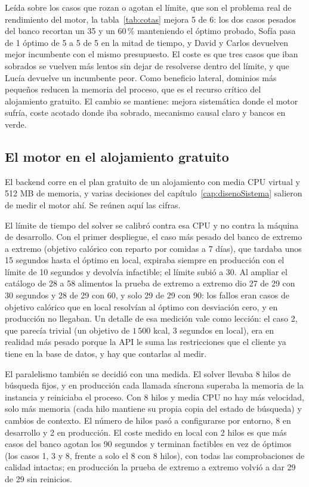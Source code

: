 Leída sobre los casos que rozan o agotan el límite, que son el problema real de rendimiento del motor, la tabla~\ref{tab:cotas} mejora 5 de 6: los dos casos pesados del banco recortan un 35 y un 60\,\% manteniendo el óptimo probado, Sofía pasa de 1 óptimo de 5 a 5 de 5 en la mitad de tiempo, y David y Carlos devuelven mejor incumbente con el mismo presupuesto. El coste es que tres casos que iban sobrados se vuelven más lentos sin dejar de resolverse dentro del límite, y que Lucía devuelve un incumbente peor. Como beneficio lateral, dominios más pequeños reducen la memoria del proceso, que es el recurso crítico del alojamiento gratuito. El cambio se mantiene: mejora sistemática donde el motor sufría, coste acotado donde iba sobrado, mecanismo causal claro y bancos en verde.

\subsection{El motor en el alojamiento gratuito}
\label{sec:evalHosting}

El backend corre en el plan gratuito de un alojamiento con media CPU virtual y 512 MB de memoria, y varias decisiones del capítulo~\ref{cap:disenoSistema} salieron de medir el motor ahí. Se reúnen aquí las cifras.

El límite de tiempo del solver se calibró contra esa CPU y no contra la máquina de desarrollo. Con el primer despliegue, el caso más pesado del banco de extremo a extremo (objetivo calórico con reparto por comidas a 7 días), que tardaba unos 15 segundos hasta el óptimo en local, expiraba siempre en producción con el límite de 10 segundos y devolvía infactible; el límite subió a 30. Al ampliar el catálogo de 28 a 58 alimentos la prueba de extremo a extremo dio 27 de 29 con 30 segundos y 28 de 29 con 60, y solo 29 de 29 con 90: los fallos eran casos de objetivo calórico que en local resolvían al óptimo con desviación cero, y en producción no llegaban. Un detalle de esa medición vale como lección: el caso 2, que parecía trivial (un objetivo de $1\,500$ kcal, 3 segundos en local), era en realidad más pesado porque la API le suma las restricciones que el cliente ya tiene en la base de datos, y hay que contarlas al medir.

El paralelismo también se decidió con una medida. El solver llevaba 8 hilos de búsqueda fijos, y en producción cada llamada síncrona superaba la memoria de la instancia y reiniciaba el proceso. Con 8 hilos y media CPU no hay más velocidad, solo más memoria (cada hilo mantiene su propia copia del estado de búsqueda) y cambios de contexto. El número de hilos pasó a configurarse por entorno, 8 en desarrollo y 2 en producción. El coste medido en local con 2 hilos es que más casos del banco agotan los 90 segundos y terminan factibles en vez de óptimos (los casos 1, 3 y 8, frente a solo el 8 con 8 hilos), con todas las comprobaciones de calidad intactas; en producción la prueba de extremo a extremo volvió a dar 29 de 29 sin reinicios.

